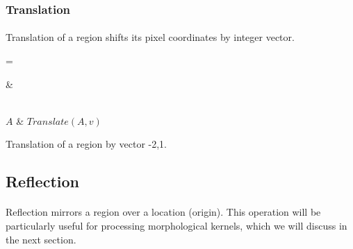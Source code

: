 \subsubsection{Translation}

\paragraph*{}
Translation of a region shifts its pixel coordinates by integer vector.

\newarray\translationInput
{}

\newarray\translationResult
{}

\dataheight=\gridwidth

\begin{table}[h!]
\centering
{}

 &

\\

$A$ &
$Translate(A, v)$

\endtabular
\caption{Translation of a region by vector -2,1.}
\label{tab:RegionTranslation}
\end{table}

\subsection{Reflection}

\paragraph*{}
Reflection mirrors a region over a location (origin). This operation will be particularly useful for processing morphological kernels, which we will discuss in the next section.

\newarray{}
{}

